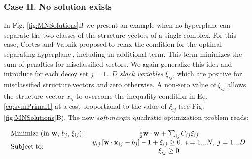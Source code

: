  \subsubsection{Case II. No solution exists}
   In Fig. \ref{fig:MNSolutions}B we present an example when no hyperplane can separate the two classes of the structure 
vectors of a single 
complex. For this case, Cortes and Vapnik proposed to relax the condition for the optimal separating hyperplane \cite{Cortes1995}, including 
an additional term. This term minimizes the sum of penalties for misclassified vectors. We again generalize this idea and introduce for each 
decoy set $j=1...D$ \emph{slack variables} $\xi_{ij}$, which are positive for misclassified structure vectors and zero otherwise. 
A non-zero value of  $\xi_{ij}$ allows the structure vector $x_{ij}$ to overcome the inequality condition in Eq. \ref{eq:svmPrimal1} at a cost 
proportional to the value of  $\xi_{ij}$ (see Fig. \ref{fig:MNSolutions}B). The new \emph{soft-margin} quadratic optimization problem reads: 

\begin{eqnarray}
\label{eq:svmSoftMargin}
\begin{tabular}{lc}
Minimize (in  $\mathbf{w}$, $b_j$, $\xi_{ij}$):& $\frac{1}{2} \mathbf{w}\cdot\mathbf{w}+ \sum_{ij}C_{ij}\xi_{ij}$ \\ 
\multirow{2}{*}{Subject to:}
&$y_{ij} \left[ \mathbf{w}\cdot \mathbf{x}_{ij}-b_j \right]-1 +\xi_{ij} \geq 0, ~ i=1...N,~j=1...D$ \\
&$\xi_{ij} \geq 0$
\end{tabular}
\end{eqnarray}


